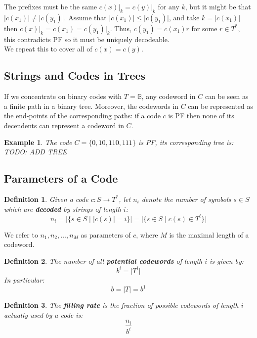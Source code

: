 \documentclass[11pt]{article}
\newtheorem{defn}{Definition}
\newtheorem{eg}{Example}
\begin{document}
The prefixes must be the same $c(x) \rvert_{k} = c(y) \rvert_{k}$ for any $k$, but it might be that $\lvert c(x_1) \rvert \neq \lvert c(y_1) \rvert$.
Assume that $\lvert c(x_1) \rvert \leq \lvert c(y_1) \rvert$, and take $k = \lvert c(x_1) \rvert$ then $c(x) \rvert_{k} = c(x_1) = c(y_1) \rvert_{k}$.
Thus, $c(y_1) = c(x_1) r$ for some $r \in T^*$, this contradicts PF so it must be uniquely decodeable. \\

We repeat this to cover all of $c(x) = c(y)$.

\subsection{Strings and Codes in Trees}
If we concentrate on binary codes with $T = \mathbb{B}$, any codeword in $C$ can be seen as a finite path in a binary tree.
Moreover, the codewords in $C$ can be represented as the end-points of the corresponding paths: if a code $c$ is PF then none of its decendents can represent a codeword in $C$.

\begin{eg}
  The code $C = \{ 0, 10, 110, 111 \}$ is PF, its corresponding tree is: \\
  TODO: ADD TREE
\end{eg}

\subsection{Parameters of a Code}
\begin{defn}
  Given a code $c: S \rightarrow T^*$, let $n_i$ denote the number of symbols $s \in S$ which are \textbf{decoded} by strings of length $i$:
  \[ n_i = \lvert \{ s \in S \mid \lvert c(s) \rvert = i \} \rvert = \lvert \{ s \in S \mid c(s) \in T^i \} \rvert \]
\end{defn}

We refer to $n_1, n_2, \ldots, n_M$ as parameters of $c$, where $M$ is the maximal length of a codeword.

\begin{defn}
  The number of all \textbf{potential codewords} of length $i$ is given by:
  \[ b^i = \lvert T^i \rvert \]
  In particular: 
  \[ b = \lvert T \rvert = b^1 \]
\end{defn}

\begin{defn}
  The \textbf{filling rate} is the fraction of possible codewords of length $i$ actually used by a code is:
  \[ \frac{n_i}{b^i} \]
\end{defn}
\end{document}
